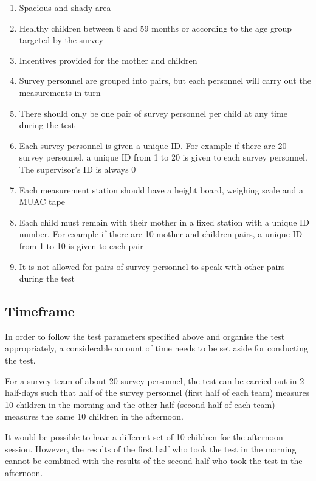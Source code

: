 \documentclass[
  12pt,
]{book}
\begin{document}
\begin{enumerate}
\def\labelenumi{\arabic{enumi}.}
\item
  Spacious and shady area
\item
  Healthy children between 6 and 59 months or according to the age group targeted by the survey
\item
  Incentives provided for the mother and children
\item
  Survey personnel are grouped into pairs, but each personnel will carry out the measurements in turn
\item
  There should only be one pair of survey personnel per child at any time during the test
\item
  Each survey personnel is given a unique ID. For example if there are 20 survey personnel, a unique ID from 1 to 20 is given to each survey personnel. The supervisor's ID is always 0
\item
  Each measurement station should have a height board, weighing scale and a MUAC tape
\item
  Each child must remain with their mother in a fixed station with a unique ID number. For example if there are 10 mother and children pairs, a unique ID from 1 to 10 is given to each pair
\item
  It is not allowed for pairs of survey personnel to speak with other pairs during the test
\end{enumerate}

\hypertarget{timeframe}{%
\subsection{Timeframe}\label{timeframe}}

In order to follow the test parameters specified above and organise the test appropriately, a considerable amount of time needs to be set aside for conducting the test.

For a survey team of about 20 survey personnel, the test can be carried out in 2 half-days such that half of the survey personnel (first half of each team) measures 10 children in the morning and the other half (second half of each team) measures the same 10 children in the afternoon.

It would be possible to have a different set of 10 children for the afternoon session. However, the results of the first half who took the test in the morning cannot be combined with the results of the second half who took the test in the afternoon.
\end{document}
